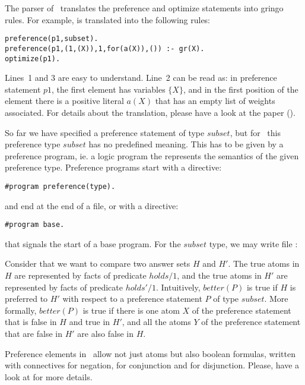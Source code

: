The parser of \asprin\ translates the preference and optimize statements into gringo rules.  
For example, 
is translated into the following rules:
\begin{lstlisting}
preference(p1,subset).
preference(p1,(1,(X)),1,for(a(X)),()) :- gr(X).
optimize(p1).
\end{lstlisting}
Lines~1 and 3 are easy to understand. 
Line~2 can be read as: in preference statement $p1$, the first element has variables $\{X\}$,  
and in the first position of the element there is a positive literal $a(X)$  that has an empty list of weights associated. 
For details about the translation, please have a look at the paper (\cite{brderosc15a}). 

So far we have specified a preference statement of type $subset$, 
but for \asprin\ this preference type $subset$ has no predefined meaning. 
This has to be given by a preference program,  ie. a logic program the represents the semantics of the given preference type. 
Preference programs start with a directive: 
\begin{lstlisting}[numbers=none]
#program preference(type).
\end{lstlisting}
and end at the end of a file, or with a directive:  
\begin{lstlisting}[numbers=none]
#program base.
\end{lstlisting}
that signals the start of a base program. 
For the $subset$ type, we may write file 
: 

Consider that we want to compare two answer sets $H$ and $H'$. 
The true atoms in $H$ are represented by facts of predicate $holds/1$,  and the true atoms in $H'$ are represented by facts of predicate $holds'/1$. 
Intuitively, $better(P)$ is true if $H$ is preferred to $H'$ with respect to a preference statement $P$ of type $subset$. 
More formally, 
$better(P)$ is true if there is one atom $X$ of the preference statement that is false in $H$ and true in $H'$, 
and all the atoms $Y$ of the preference statement that are false in $H'$ are also false in $H$.  

\begin{note}
Preference elements in \asprin\ allow not just atoms 
but also boolean formulas, written with connectives \code{\~} for negation, 
\code{\&} for conjunction and \code{|} for disjunction.
Please, have a look at \cite{brderosc15a} for more details. 
\end{note}

